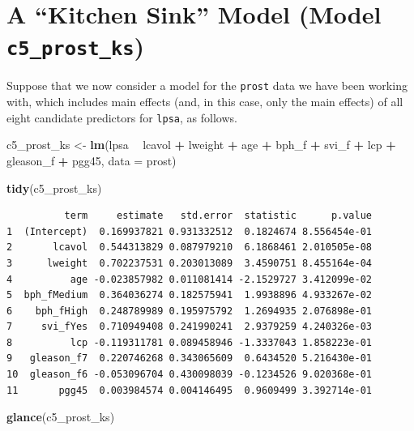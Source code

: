 \documentclass[]{book}
\newenvironment{Shaded}{\begin{snugshade}}{\end{snugshade}}
\newcommand{\KeywordTok}[1]{\textcolor[rgb]{0.13,0.29,0.53}{\textbf{#1}}}
\newcommand{\DataTypeTok}[1]{\textcolor[rgb]{0.13,0.29,0.53}{#1}}
\newcommand{\StringTok}[1]{\textcolor[rgb]{0.31,0.60,0.02}{#1}}
\newcommand{\OperatorTok}[1]{\textcolor[rgb]{0.81,0.36,0.00}{\textbf{#1}}}
\newcommand{\NormalTok}[1]{#1}
\theoremstyle{definition}
\theoremstyle{definition}
\theoremstyle{definition}
\theoremstyle{remark}
\begin{document}
\section{\texorpdfstring{A ``Kitchen Sink'' Model (Model
\texttt{c5\_prost\_ks})}{A Kitchen Sink Model (Model c5\_prost\_ks)}}\label{a-kitchen-sink-model-model-c5_prost_ks}

Suppose that we now consider a model for the \texttt{prost} data we have
been working with, which includes main effects (and, in this case, only
the main effects) of all eight candidate predictors for \texttt{lpsa},
as follows.

\begin{Shaded}
\begin{Highlighting}[]
\NormalTok{c5_prost_ks <-}\StringTok{ }\KeywordTok{lm}\NormalTok{(lpsa }\OperatorTok{~}\StringTok{ }\NormalTok{lcavol }\OperatorTok{+}\StringTok{ }\NormalTok{lweight }\OperatorTok{+}\StringTok{ }\NormalTok{age }\OperatorTok{+}\StringTok{ }\NormalTok{bph_f }\OperatorTok{+}\StringTok{ }\NormalTok{svi_f }\OperatorTok{+}\StringTok{ }
\StringTok{                }\NormalTok{lcp }\OperatorTok{+}\StringTok{ }\NormalTok{gleason_f }\OperatorTok{+}\StringTok{ }\NormalTok{pgg45, }\DataTypeTok{data =}\NormalTok{ prost)}

\KeywordTok{tidy}\NormalTok{(c5_prost_ks)}
\end{Highlighting}
\end{Shaded}

\begin{verbatim}
          term     estimate   std.error  statistic      p.value
1  (Intercept)  0.169937821 0.931332512  0.1824674 8.556454e-01
2       lcavol  0.544313829 0.087979210  6.1868461 2.010505e-08
3      lweight  0.702237531 0.203013089  3.4590751 8.455164e-04
4          age -0.023857982 0.011081414 -2.1529727 3.412099e-02
5  bph_fMedium  0.364036274 0.182575941  1.9938896 4.933267e-02
6    bph_fHigh  0.248789989 0.195975792  1.2694935 2.076898e-01
7     svi_fYes  0.710949408 0.241990241  2.9379259 4.240326e-03
8          lcp -0.119311781 0.089458946 -1.3337043 1.858223e-01
9   gleason_f7  0.220746268 0.343065609  0.6434520 5.216430e-01
10  gleason_f6 -0.053096704 0.430098039 -0.1234526 9.020368e-01
11       pgg45  0.003984574 0.004146495  0.9609499 3.392714e-01
\end{verbatim}

\begin{Shaded}
\begin{Highlighting}[]
\KeywordTok{glance}\NormalTok{(c5_prost_ks)}
\end{Highlighting}
\end{Shaded}
\end{document}
